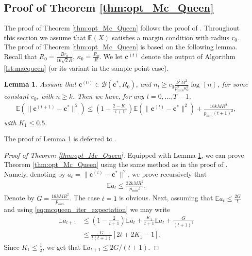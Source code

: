 \documentclass[noinfoline,preprint]{article}
\newtheorem{lem}[theorem]{Lemma}
\newcommand{\cb}{\mathbf{c}}
\newcommand{\E}{\mathbb{E}}
\renewcommand{\1}{\mathds 1}
\begin{document}
\subsection{Proof of Theorem \ref{thm:opt_Mc_Queen}}\label{sec:proof_thm_opt_Mc_Queen}
The proof of Theorem \ref{thm:opt_Mc_Queen} follows the proof of \cite[Lemma 1]{Rakhlin11}. 
Throughout this section we assume that $\E(X)$ satisfies a margin condition with radius $r_0$. The proof of Theorem \ref{thm:opt_Mc_Queen} is based on the following lemma. Recall that $R_0= \frac{Br_0}{16\sqrt{2}R}$, $\kappa_0 = \frac{R_0}{R}$. We let $\cb^{(t)}$ denote the output of Algorithm \ref{lst:macqueen} (or its variant in the sample point case).
\begin{lem}\label{lem:onestep_McQueen}
Assume that $\cb^{(0)} \in \mathcal{B}(\cb^*,R_0)$, and $n_t \geq c_0 \frac{k^2M^2}{p_{min}^2 \kappa_0^2} \log(n)$, for some constant $c_0$, with $n \geq k$. Then we have, for any $t =0, \hdots, T-1$,
\begin{align}\label{eq:mcqueen_iter_expectation}
\E \left ( \| \cb^{(t+1)} - \cb^*\|^2 \right ) \leq \left ( 1 - \frac{2-K_1}{t+1} \right ) \E \left ( \| \cb^{(t)} - \cb^* \|^2 \right ) + \frac{16kMR^2}{p_{min}(t+1)^2},
\end{align}
with $K_1 \leq 0.5$.
\end{lem}
The proof of Lemma \ref{lem:onestep_McQueen} is deferred to .
\begin{proof}[Proof of Theorem \ref{thm:opt_Mc_Queen}]
Equipped with Lemma \ref{lem:onestep_McQueen}, we can prove Theorem \ref{thm:opt_Mc_Queen} using the same method as in the proof of \cite[Lemma 1]{Rakhlin11}. Namely, denoting by $a_t = \| \cb^{(t)} - \cb^*\|^2$, we prove recursively that 
\begin{align*}
\E a_t \leq \frac{32kMR^2}{p_{min}t}.
\end{align*}
Denote by $G=\frac{16kMR^2}{p_{min}}$. The case $t=1$ is obvious. Next, assuming that $\E a_t \leq \frac{2G}{t}$ and using \eqref{eq:mcqueen_iter_expectation} we may write
\begin{align*}
\E a_{t+1} & \leq \left ( 1 - \frac{2}{t+1} \right )\E a_t + \frac{K_1}{t+1}\E a_t + \frac{G}{(t+1)^2} \\
& \leq \frac{G}{t(t+1)} \left [ 2 t +2K_1-1 \right ].
\end{align*}
Since $K_1 \leq \frac{1}{2}$, we get that $\E a_{t+1} \leq 2G/(t+1)$.
\end{proof} 
\end{document}
